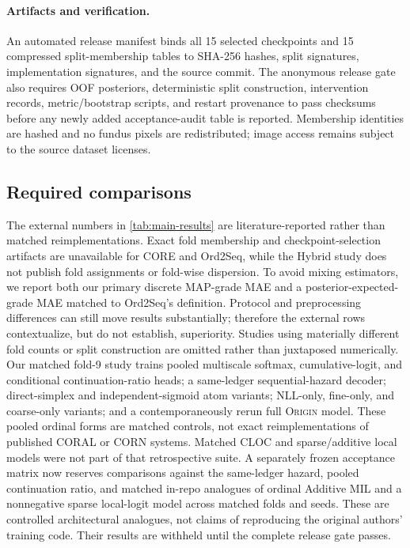 \documentclass[10pt,twocolumn,letterpaper]{article}
\newcommand{\method}{\textsc{Origin}\xspace}
\begin{document}
\paragraph{Artifacts and verification.}
An automated release manifest binds all 15 selected checkpoints and 15
compressed split-membership tables to SHA-256 hashes, split signatures,
implementation signatures, and the source commit.  The anonymous release gate
also requires OOF posteriors, deterministic split construction, intervention
records, metric/bootstrap scripts, and restart provenance to pass checksums
before any newly added acceptance-audit table is reported.  Membership
identities are hashed and no fundus pixels are redistributed; image access
remains subject to the source dataset licenses.

\subsection{Required comparisons}

The external numbers in \cref{tab:main-results} are literature-reported rather
than matched reimplementations.  Exact fold membership and checkpoint-selection
artifacts are unavailable for CORE and Ord2Seq, while the Hybrid study does not
publish fold assignments or fold-wise dispersion.  To avoid mixing estimators,
we report both our primary discrete MAP-grade MAE and a posterior-expected-grade
MAE matched to Ord2Seq's definition.  Protocol and preprocessing differences
can still move results substantially; therefore the external rows contextualize,
but do not establish, superiority.  Studies using materially different fold
counts or split construction are omitted rather than juxtaposed numerically.
Our matched fold-9 study trains pooled multiscale softmax, cumulative-logit,
and conditional continuation-ratio heads; a same-ledger sequential-hazard
decoder; direct-simplex and independent-sigmoid atom variants; NLL-only,
fine-only, and coarse-only variants; and a contemporaneously rerun full
\method model.  These pooled ordinal forms are matched controls, not exact
reimplementations of published CORAL or CORN systems.  Matched CLOC and
sparse/additive local models were not part of that retrospective suite.  A
separately frozen acceptance matrix now reserves comparisons against the
same-ledger hazard, pooled continuation ratio, and matched in-repo analogues of
ordinal Additive MIL and a nonnegative sparse local-logit model across matched
folds and seeds.  These
are controlled architectural analogues, not claims of reproducing the original
authors' training code.  Their results are withheld until the complete release
gate passes.
\end{document}
